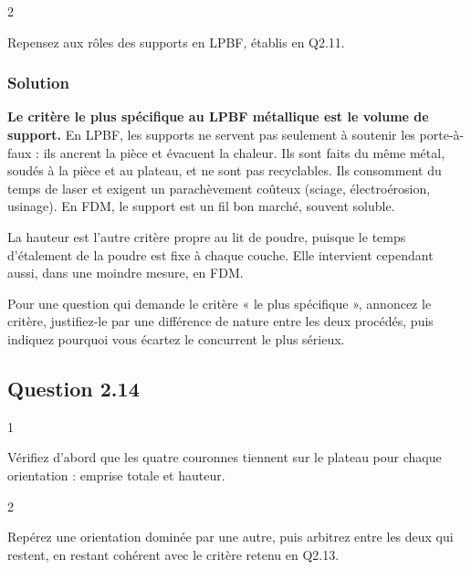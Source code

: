 \documentclass[11pt,a4paper]{article}
\begin{document}
\begin{indication}{2}

Repensez aux rôles des supports en LPBF, établis en Q2.11.

\end{indication}

\hypertarget{solution-26}{%
\subsubsection{Solution}\label{solution-26}}

\textbf{Le critère le plus spécifique au LPBF métallique est le volume de support.} En LPBF, les supports ne servent pas seulement à soutenir les porte-à-faux : ils ancrent la pièce et évacuent la chaleur. Ils sont faits du même métal, soudés à la pièce et au plateau, et ne sont pas recyclables. Ils consomment du temps de laser et exigent un parachèvement coûteux (sciage, électroérosion, usinage). En FDM, le support est un fil bon marché, souvent soluble.

La hauteur est l'autre critère propre au lit de poudre, puisque le temps d'étalement de la poudre est fixe à chaque couche. Elle intervient cependant aussi, dans une moindre mesure, en FDM.

\begin{methode}

Pour une question qui demande le critère « le plus spécifique », annoncez le critère, justifiez-le par une différence de nature entre les deux procédés, puis indiquez pourquoi vous écartez le concurrent le plus sérieux.

\end{methode}

\hypertarget{question-2.14}{%
\subsection{Question 2.14}\label{question-2.14}}

\begin{indication}{1}

Vérifiez d'abord que les quatre couronnes tiennent sur le plateau pour chaque orientation : emprise totale et hauteur.

\end{indication}

\begin{indication}{2}

Repérez une orientation dominée par une autre, puis arbitrez entre les deux qui restent, en restant cohérent avec le critère retenu en Q2.13.

\end{indication}
\end{document}
